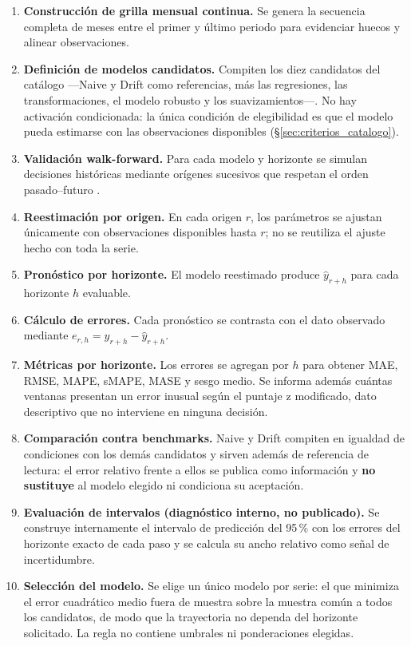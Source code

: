 \documentclass[12pt,letterpaper]{article}
\providecommand{\parencite}{\citep}
\begin{document}
\begin{enumerate}[leftmargin=*,label=\textbf{\arabic*.}]
    \item \textbf{Construcción de grilla mensual continua.} Se genera la secuencia completa de meses entre el primer y último periodo para evidenciar huecos y alinear observaciones.
    \item \textbf{Definición de modelos candidatos.} Compiten los diez candidatos del catálogo ---Naive y Drift como referencias, más las regresiones, las transformaciones, el modelo robusto y los suavizamientos---. No hay activación condicionada: la única condición de elegibilidad es que el modelo pueda estimarse con las observaciones disponibles (§\ref{sec:criterios_catalogo}).
    \item \textbf{Validación walk-forward.} Para cada modelo y horizonte se simulan decisiones históricas mediante orígenes sucesivos que respetan el orden pasado--futuro \parencite{tashman2000}.
    \item \textbf{Reestimación por origen.} En cada origen \(r\), los parámetros se ajustan únicamente con observaciones disponibles hasta \(r\); no se reutiliza el ajuste hecho con toda la serie.
    \item \textbf{Pronóstico por horizonte.} El modelo reestimado produce \(\hat y_{r+h}\) para cada horizonte \(h\) evaluable.
    \item \textbf{Cálculo de errores.} Cada pronóstico se contrasta con el dato observado mediante \(e_{r,h}=y_{r+h}-\hat y_{r+h}\).
    \item \textbf{Métricas por horizonte.} Los errores se agregan por \(h\) para obtener MAE, RMSE, MAPE, sMAPE, MASE y sesgo medio. Se informa además cuántas ventanas presentan un error inusual según el puntaje z modificado, dato descriptivo que no interviene en ninguna decisión.
    \item \textbf{Comparación contra benchmarks.} Naive y Drift compiten en igualdad de condiciones con los demás candidatos y sirven además de referencia de lectura: el error relativo frente a ellos se publica como información y \textbf{no sustituye} al modelo elegido ni condiciona su aceptación.
    \item \textbf{Evaluación de intervalos (diagnóstico interno, no publicado).} Se construye internamente el intervalo de predicción del 95\,\% con los errores del horizonte exacto de cada paso y se calcula su ancho relativo como señal de incertidumbre.
    \item \textbf{Selección del modelo.} Se elige un único modelo por serie: el que minimiza el error cuadrático medio fuera de muestra sobre la muestra común a todos los candidatos, de modo que la trayectoria no dependa del horizonte solicitado. La regla no contiene umbrales ni ponderaciones elegidas.

\end{enumerate}
\end{document}
